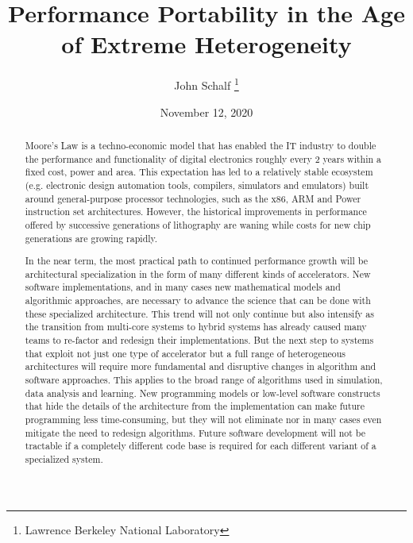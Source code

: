 \documentclass{article}
\title{Performance Portability in the Age of Extreme Heterogeneity}
\author{John Schalf \thanks{Lawrence Berkeley National Laboratory }}
\date{November 12, 2020}
\begin{document}
\maketitle

\begin{abstract}
Moore’s Law is a techno-economic model that has enabled the IT industry to double the performance and functionality of digital electronics roughly every 2 years within a fixed cost, power and area. This expectation has led to a relatively stable ecosystem (e.g. electronic design automation tools, compilers, simulators and emulators) built around general-purpose processor technologies, such as the x86, ARM and Power instruction set architectures. However, the historical improvements in performance offered by successive generations of lithography are waning while costs for new chip generations are growing rapidly.

In the near term, the most practical path to continued performance growth will be architectural specialization in the form of many different kinds of accelerators. New software implementations, and in many cases new mathematical models and algorithmic approaches, are necessary to advance the science that can be done with these specialized architecture. This trend will not only continue but also intensify as the transition from multi-core systems to hybrid systems has already caused many teams to re-factor and redesign their implementations. But the next step to systems that exploit not just one type of accelerator but a full range of heterogeneous architectures will require more fundamental and disruptive changes in algorithm and software approaches. This applies to the broad range of algorithms used in simulation, data analysis and learning. New programming models or low-level software constructs that hide the details of the architecture from the implementation can make future programming less time-consuming, but they will not eliminate nor in many cases even mitigate the need to redesign algorithms.  Future software development will not be tractable if a completely different code base is required for each different variant of a specialized system.


\end{abstract}
\end{document}
